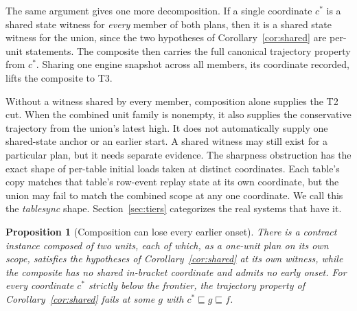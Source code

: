 \documentclass[sigconf,nonacm,10pt]{acmart}
\theoremstyle{plain}
\newtheorem{proposition}{Proposition}
\theoremstyle{definition}
\newcommand{\pre}{\sqsubseteq}                   %
\begin{document}
The same argument gives one more decomposition. If a single
coordinate $c^{\ast}$ is a shared state witness for \emph{every}
member of both plans, then it is a shared state witness for the 
union, since the two hypotheses of Corollary~\ref{cor:shared} are per-unit 
statements. The composite then carries the full canonical trajectory property 
from $c^{\ast}$. Sharing one engine snapshot across all members,
its coordinate recorded, lifts the composite to T3.

Without a witness shared by every member, composition alone supplies
the T2 cut. When the combined unit family is nonempty, it also supplies
the conservative trajectory from the union's latest high. It does not automatically supply one shared-state anchor
or an earlier start. A shared witness may still exist for a particular
plan, but it needs separate evidence. The sharpness obstruction has
the exact shape of per-table initial
loads taken at distinct coordinates. Each table's copy matches that
table's row-event replay state at its own coordinate, but the union
may fail to match the combined scope at any one coordinate. We call this the
\emph{tablesync} shape. Section~\ref{sec:tiers} categorizes the real systems
that have it.

\begin{proposition}[Composition can lose every earlier onset]\label{prop:sync}
There is a contract instance composed of two units, each of which,
as a one-unit plan on its own scope, satisfies 
the hypotheses of Corollary~\ref{cor:shared} at its own witness, while the
composite has no shared in-bracket coordinate and admits \emph{no}
early onset. For every coordinate
$c^{\ast}$ strictly below the frontier, the trajectory property of
Corollary~\ref{cor:shared} fails at some $g$ with
$c^{\ast} \pre g \pre f$.
\end{proposition}
\end{document}
